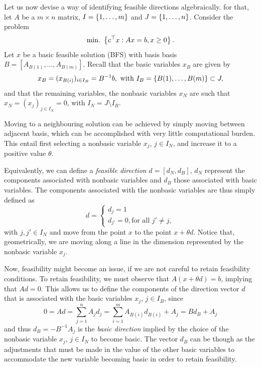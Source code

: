 Let us now devise a way of identifying feasible directions algebraically. for that, let $A$ be a $m \times n$ matrix, $I = \left\{ 1,\dots,m \right \}$ and $J = \left\{ 1,\dots,n \right \}$. Consider the problem 
%
\begin{equation*}
	\mathop{\text{min.~}} \left\{ c^\top x : Ax = b, x \geq 0 \right \}.	
\end{equation*}
%
Let $x$ be a basic feasible solution (BFS) with basis basis $B = [A_{B(1)}, \dots, A_{B(m)}]$. Recall that the basic variables $x_B$ are given by
%
\begin{equation*}
	x_B = (x_{B(i)})_{i \in I_B} = B^{-1}b, \text{ with } I_B = \left\{ B(1), \dots, B(m) \right \} \subset J,	
\end{equation*}
%
and that the remaining variables, the nonbasic variables $x_N$ are such that $x_N = (x_j)_{j \in I_N} = 0$, with $I_N = J \setminus I_B$.

Moving to a neighbouring solution can be achieved by simply moving between adjacent basis, which can be accomplished  with very little computational burden. This entail first selecting a nonbasic variable $x_j$, $j \in I_N$, and increase it to a positive value $\theta$. 

Equivalently, we can define a \emph{feasible direction} $d = [d_N, d_B]$, $d_N$ represent the components associated with nonbasic variables and $d_B$ those associated with basic variables. The components associated with the nonbasic variables are thus simply defined as 
%
\begin{equation*}
d = \begin{cases} d_j = 1 \\ 
				  d_{j'} = 0, \text{for all } j' \neq j, 
	\end{cases}	
\end{equation*}
%
with $j, j' \in I_N$ and move from the point $x$ to the point $x + \theta d$. Notice that, geometrically, we are moving along a line in the dimension represented by the nonbasic variable $x_j$.

Now, feasibility might become an issue, if we are not careful to retain feasibility conditions. To retain feasibility, we must observe that $A(x + \theta d) = b$, implying that $Ad = 0$. This allows us to define the components of the direction vector $d$ that is associated with the basic variables $x_j$, $j \in I_B$, since
%
\begin{equation*}
	0 = Ad = \sum_{j = 1}^n	A_j d_j = \sum_{i = 1}^m A_{B(i)}d_{B(i)} + A_j = Bd_B + A_j
\end{equation*}
%
and thus $d_B = -B^{-1} A_j$ is the \emph{basic direction} implied by the choice of the nonbasic variable $x_j$, $j \in I_N$ to become basic. The vector $d_B$ can be though as the adjustments that must be made in the value of the other basic variables to accommodate the new variable becoming basic in order to retain feasibility. 


